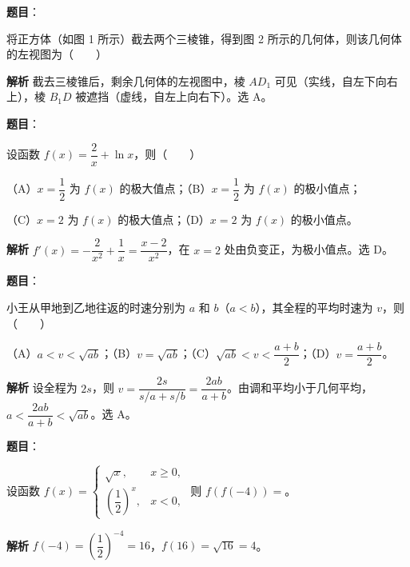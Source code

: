 \begin{answer}

\textbf{题目}：

将正方体（如图 1 所示）截去两个三棱锥，得到图 2 所示的几何体，则该几何体的左视图为\mbox{（　　）}
\nopagebreak[4]
\begin{center}\end{center}
\nopagebreak[4]
\textbf{解析}
截去三棱锥后，剩余几何体的左视图中，棱 $AD_1$ 可见（实线，自左下向右上），棱 $B_1D$ 被遮挡（虚线，自左上向右下）。选 A。


\end{answer}
\begin{answer}

\textbf{题目}：

设函数 $f(x)=\dfrac2x+\ln x$，则\mbox{（　　）}

（A）$x=\dfrac12$ 为 $f(x)$ 的极大值点；（B）$x=\dfrac12$ 为 $f(x)$ 的极小值点；

（C）$x=2$ 为 $f(x)$ 的极大值点；（D）$x=2$ 为 $f(x)$ 的极小值点。

\textbf{解析}
$f'(x)=-\dfrac2{x^2}+\dfrac1x=\dfrac{x-2}{x^2}$，在 $x=2$ 处由负变正，为极小值点。选 D。


\end{answer}
\begin{answer}

\textbf{题目}：

小王从甲地到乙地往返的时速分别为 $a$ 和 $b$（$a<b$），其全程的平均时速为 $v$，则\mbox{（　　）}

（A）$a<v<\sqrt{ab}$；（B）$v=\sqrt{ab}$；（C）$\sqrt{ab}<v<\dfrac{a+b}2$；（D）$v=\dfrac{a+b}2$。

\textbf{解析}
设全程为 $2s$，则 $v=\dfrac{2s}{s/a+s/b}=\dfrac{2ab}{a+b}$。由调和平均小于几何平均，$a<\dfrac{2ab}{a+b}<\sqrt{ab}$。选 A。


\end{answer}
\begin{answer}

\textbf{题目}：

设函数 $f(x)=\begin{cases}\sqrt x,&x\geqslant0,\\ \left(\dfrac12\right)^x,&x<0,\end{cases}$ 则 $f(f(-4))=$\gkblank{}。

\textbf{解析}
$f(-4)=\left(\dfrac12\right)^{-4}=16$，$f(16)=\sqrt{16}=4$。


\end{answer}
